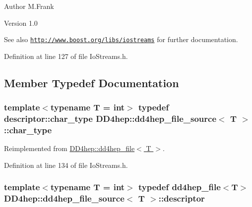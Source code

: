 \begin{DoxyAuthor}{Author}
M.Frank 
\end{DoxyAuthor}
\begin{DoxyVersion}{Version}
1.0
\end{DoxyVersion}
\begin{DoxySeeAlso}{See also}
\href{http://www.boost.org/libs/iostreams}{\tt http://www.boost.org/libs/iostreams} for further documentation. 
\end{DoxySeeAlso}


Definition at line 127 of file IoStreams.h.

\subsection{Member Typedef Documentation}
\hypertarget{class_d_d4hep_1_1dd4hep__file__source_ad18eef60f1b38b5958eec9f287dac85a}{
\subsubsection[{char\_\-type}]{\setlength{\rightskip}{0pt plus 5cm}template$<$typename T = int$>$ typedef {\bf descriptor::char\_\-type} {\bf DD4hep::dd4hep\_\-file\_\-source}$<$ {\bf T} $>$::{\bf char\_\-type}}}
\label{class_d_d4hep_1_1dd4hep__file__source_ad18eef60f1b38b5958eec9f287dac85a}


Reimplemented from \hyperlink{class_d_d4hep_1_1dd4hep__file_aef4242f7f2fe15a59f7bf7a8f6ba24d5}{DD4hep::dd4hep\_\-file$<$ T $>$}.

Definition at line 134 of file IoStreams.h.\hypertarget{class_d_d4hep_1_1dd4hep__file__source_acd7bec0e43b763cf692f18ce75a4dba8}{
\subsubsection[{descriptor}]{\setlength{\rightskip}{0pt plus 5cm}template$<$typename T = int$>$ typedef {\bf dd4hep\_\-file}$<${\bf T}$>$ {\bf DD4hep::dd4hep\_\-file\_\-source}$<$ {\bf T} $>$::{\bf descriptor}}}
\label{class_d_d4hep_1_1dd4hep__file__source_acd7bec0e43b763cf692f18ce75a4dba8}


